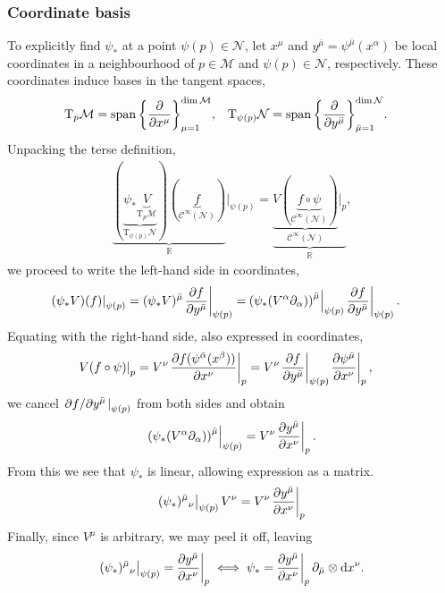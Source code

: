 \documentclass[a5paper]{article}
\newcommand{\M}{\mathcal{M}}
\newcommand{\N}{\mathcal{N}}
\newcommand{\T}{\mathrm{T}}
\newcommand{\R}{\mathbb{R}}
\newcommand{\Cinf}{\mathcal{C}^\infty}
\renewcommand{\eval}[1]{\!\left.{#1}\right|}
\begin{document}
\subsubsection*{Coordinate basis}
To explicitly find $\psi_*$ at a point $\psi(p) \in \N$, let $x^\mu$ and $y^{\bar\mu} = \psi^{\bar\mu}(x^\alpha)$ be local coordinates in a neighbourhood of $p \in \M$ and $\psi(p) \in \N$, respectively.
These coordinates induce bases in the tangent spaces,
\begin{align}
	\T_p\M &= \operatorname{span}\qty{\pdv{x^\mu}}_{\mu=1}^{\dim\M}
,&	\T_{\psi(p)}\N &= \operatorname{span}\qty{\pdv{y^{\bar\mu}}}_{\bar\mu=1}^{\dim\N}
.\end{align}
Unpacking the terse definition,
\begin{align}
	\underbrace{
		(\underbrace{
			\psi_*\underbrace{V}_{\T_p\M}
		}_{\T_{\psi(p)}\N})(\underbrace{f}_{\Cinf(\N)})
	}_\R \Big|_{\psi(p)}
	= \underbrace{
		\underbrace{
			V(\underbrace{f\circ\psi}_{\Cinf(\N)})
		}_{\Cinf(\N)}\Big|_p
	}_\R
	\label{eqn:def-for-functional}
,\end{align}
we proceed to write the left-hand side in coordinates,
\begin{align}
	\eval{(\psi_*V)(f)}_{\psi(p)}
	&= (\psi_*V)^{\bar\mu}
		\eval{\pdv{f}{y^{\bar\mu}}}_{\psi(p)}
	= \eval{\qty(\psi_*(V^\alpha\partial_\alpha))^{\bar\mu}}_{\psi(p)}
	\eval{\pdv{f}{y^{\bar\mu}}}_{\psi(p)}
.\end{align}
Equating with the right-hand side, also expressed in coordinates,
\begin{align}
	\eval{V(f\circ\psi)}_p
	&= V^\nu
		\eval{\pdv{f(\psi^{\bar\alpha}(x^\beta))}{x^\nu}}_p
	= V^\nu
		\eval{\pdv{f}{y^{\bar\mu}}}_{\psi(p)}
		\eval{\pdv{\psi^{\bar\mu}}{x^\nu}}_p
,\end{align}
we cancel $\eval{\pdv*{f}{y^{\bar\mu}}}_{\psi(p)}$ from both sides and obtain
\begin{align}
	\eval{\qty(\psi_*(V^\alpha\partial_\alpha))^{\bar\mu}}_{\psi(p) }
	= V^\nu\eval{\pdv{y^{\bar\mu}}{x^\nu}}_p
.\end{align}
From this we see that $\psi_*$ is linear, allowing expression as a matrix.
\begin{align}
	\eval{(\psi_*)^{\bar\mu}{}_\nu}_{\psi(p)} V^\nu
	= V^\nu \eval{\pdv{y^{\bar\mu}}{x^\nu}}_p
\end{align}
Finally, since $V^\mu$ is arbitrary, we may peel it off, leaving
\begin{align}
	\eval{(\psi_*)^{\bar\mu}{}_\nu}_{\psi(p)} = \eval{\pdv{y^{\bar\mu}}{x^\nu}}_p
	\iff
	\psi_* = \eval{\pdv{y^{\bar\mu}}{x^\nu}}_p \partial_{\bar\mu} \otimes \dd x^\nu
.\end{align}
\end{document}
